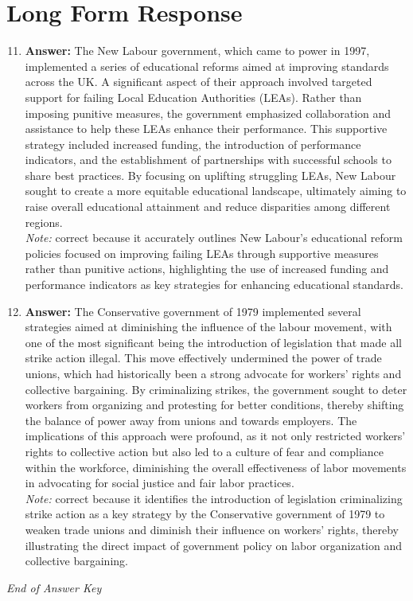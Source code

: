 \documentclass[12pt]{article}
\begin{document}
\section*{Long Form Response}
\begin{enumerate}[label=\arabic*.]
\setcounter{enumi}{10}
\item \textbf{Answer:} The New Labour government, which came to power in 1997, implemented a series of educational reforms aimed at improving standards across the UK. A significant aspect of their approach involved targeted support for failing Local Education Authorities (LEAs). Rather than imposing punitive measures, the government emphasized collaboration and assistance to help these LEAs enhance their performance. This supportive strategy included increased funding, the introduction of performance indicators, and the establishment of partnerships with successful schools to share best practices. By focusing on uplifting struggling LEAs, New Labour sought to create a more equitable educational landscape, ultimately aiming to raise overall educational attainment and reduce disparities among different regions.
\\ \textit{Note:} correct because it accurately outlines New Labour's educational reform policies focused on improving failing LEAs through supportive measures rather than punitive actions, highlighting the use of increased funding and performance indicators as key strategies for enhancing educational standards.
\item \textbf{Answer:} The Conservative government of 1979 implemented several strategies aimed at diminishing the influence of the labour movement, with one of the most significant being the introduction of legislation that made all strike action illegal. This move effectively undermined the power of trade unions, which had historically been a strong advocate for workers' rights and collective bargaining. By criminalizing strikes, the government sought to deter workers from organizing and protesting for better conditions, thereby shifting the balance of power away from unions and towards employers. The implications of this approach were profound, as it not only restricted workers' rights to collective action but also led to a culture of fear and compliance within the workforce, diminishing the overall effectiveness of labor movements in advocating for social justice and fair labor practices.
\\ \textit{Note:} correct because it identifies the introduction of legislation criminalizing strike action as a key strategy by the Conservative government of 1979 to weaken trade unions and diminish their influence on workers' rights, thereby illustrating the direct impact of government policy on labor organization and collective bargaining.
\end{enumerate}

\vfill
\noindent\textit{End of Answer Key}
\end{document}
